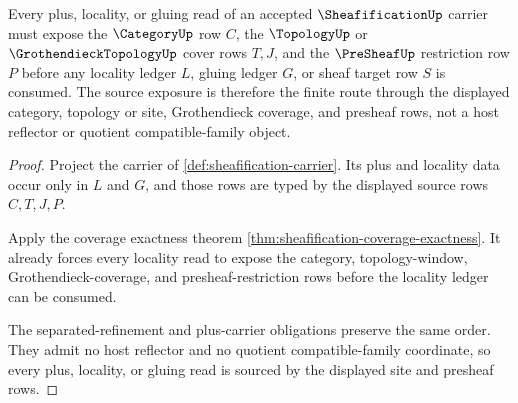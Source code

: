 \begin{theorem}
\label{thm:sheafification-site-source-exposure}
Every plus, locality, or gluing read of an accepted $\SheafificationUp$ carrier must expose the $\CategoryUp$ row $C$, the $\TopologyUp$ or $\GrothendieckTopologyUp$ cover rows $T,J$, and the $\PreSheafUp$ restriction row $P$ before any locality ledger $L$, gluing ledger $G$, or sheaf target row $S$ is consumed. The source exposure is therefore the finite route through the displayed category, topology or site, Grothendieck coverage, and presheaf rows, not a host reflector or quotient compatible-family object.
\end{theorem}
\begin{proof}
Project the carrier of \autoref{def:sheafification-carrier}. Its plus and locality data occur only in $L$ and $G$, and those rows are typed by the displayed source rows $C,T,J,P$.

Apply the coverage exactness theorem \autoref{thm:sheafification-coverage-exactness}. It already forces every locality read to expose the category, topology-window, Grothendieck-coverage, and presheaf-restriction rows before the locality ledger can be consumed.

The separated-refinement and plus-carrier obligations preserve the same order. They admit no host reflector and no quotient compatible-family coordinate, so every plus, locality, or gluing read is sourced by the displayed site and presheaf rows.
\end{proof}

